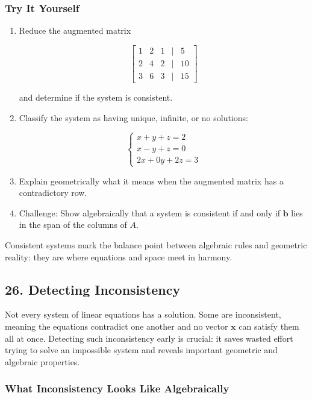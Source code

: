 \documentclass[
  letterpaper,
  DIV=11,
  numbers=noendperiod]{scrreprt}
\begin{document}
\subsubsection{Try It Yourself}\label{try-it-yourself-24}

\begin{enumerate}
\def\labelenumi{\arabic{enumi}.}
\item
  Reduce the augmented matrix

  \[
  \begin{bmatrix}  
  1 & 2 & 1 & | & 5 \\  
  2 & 4 & 2 & | & 10 \\  
  3 & 6 & 3 & | & 15  
  \end{bmatrix}
  \]

  and determine if the system is consistent.
\item
  Classify the system as having unique, infinite, or no solutions:

  \[
  \begin{cases}  
  x + y + z = 2 \\  
  x - y + z = 0 \\  
  2x + 0y + 2z = 3  
  \end{cases}
  \]
\item
  Explain geometrically what it means when the augmented matrix has a
  contradictory row.
\item
  Challenge: Show algebraically that a system is consistent if and only
  if \(\mathbf{b}\) lies in the span of the columns of \(A\).
\end{enumerate}

Consistent systems mark the balance point between algebraic rules and
geometric reality: they are where equations and space meet in harmony.

\subsection{26. Detecting Inconsistency}\label{detecting-inconsistency}

Not every system of linear equations has a solution. Some are
inconsistent, meaning the equations contradict one another and no vector
\(\mathbf{x}\) can satisfy them all at once. Detecting such
inconsistency early is crucial: it saves wasted effort trying to solve
an impossible system and reveals important geometric and algebraic
properties.

\subsubsection{What Inconsistency Looks Like
Algebraically}\label{what-inconsistency-looks-like-algebraically}
\end{document}
